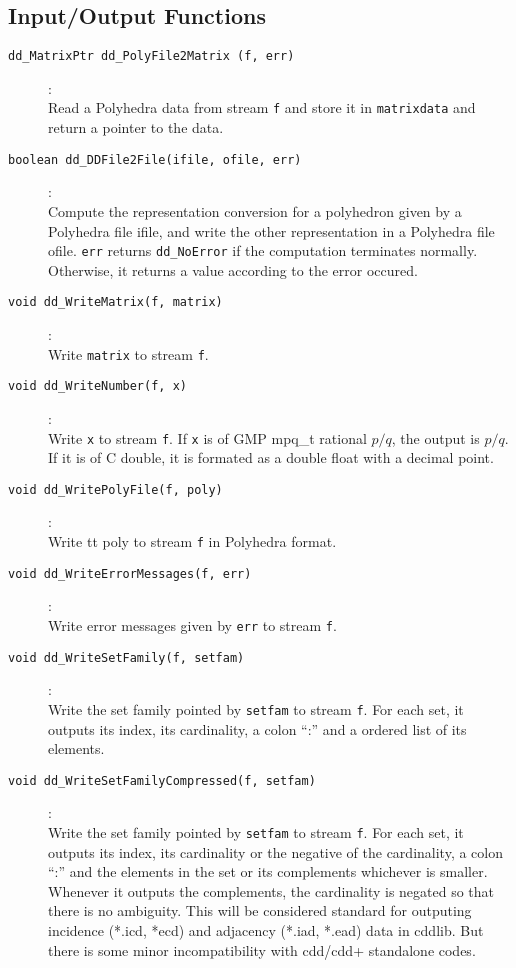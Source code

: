 \documentclass[11pt]{article}
\newcommand {\0} {{\bf 0}}
\begin{document}
\subsection{Input/Output Functions}  \label{IOLibrary}

\begin{description}

\item[{\tt dd\_MatrixPtr dd\_PolyFile2Matrix (f, err)}]:\\
Read a Polyhedra data from stream {\tt f} and store it in {\tt matrixdata}
and return a pointer to the data.

\item[{\tt boolean dd\_DDFile2File(ifile, ofile, err)}]:\\
Compute the representation conversion for a polyhedron given
by a Polyhedra file ifile, and write the other representation
in a Polyhedra file ofile.  {\tt *err}
returns {\tt dd\_NoError} if the computation terminates normally.  Otherwise,
it returns a value according to the error occured.

\item[{\tt void dd\_WriteMatrix(f, matrix)}]:\\
Write {\tt  matrix} to stream {\tt f}.

\item[{\tt void dd\_WriteNumber(f, x)}]:\\
Write {\tt x} to stream {\tt f}.  If {\tt x} is of GMP mpq\_t rational $p/q$,
the output is $p/q$.  If it is of C double, it is formated as a double float
with a decimal point.

\item[{\tt void dd\_WritePolyFile(f, poly)}]:\\
Write {tt poly} to stream {\tt f} in Polyhedra format.

\item[{\tt void dd\_WriteErrorMessages(f, err)}]:\\
Write error messages given by {\tt err} to stream {\tt f}.

\item[{\tt void dd\_WriteSetFamily(f, setfam)}]:\\
Write the set family pointed by {\tt setfam} to stream {\tt f}.
For each set, it outputs its index, its cardinality,
a colon ``:'' and a ordered list of its elements.

\item[{\tt void dd\_WriteSetFamilyCompressed(f, setfam)}]:\\
Write the set family pointed by {\tt setfam} to stream {\tt f}.
For each set, it outputs its index, its cardinality or the
negative of the cardinality, a colon ``:''
 and the elements in the set or its complements whichever is smaller.
Whenever it outputs the complements, the cardinality is negated
so that there is no ambiguity.
This will be considered standard for
outputing incidence (*.icd, *ecd) and adjacency 
(*.iad, *.ead) data in cddlib.   But there is some minor incompatibility
with cdd/cdd+ standalone codes.


\end{description}
\end{document}

